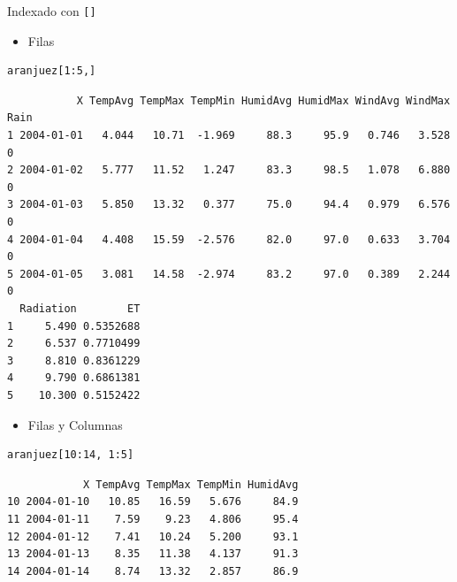 \documentclass[xcolor={usenames,svgnames,dvipsnames}]{beamer}
\begin{document}
\begin{frame}[fragile,label=sec-5-2-1]{Indexado con \texttt{[]}}
 \begin{itemize}
\item Filas
\end{itemize}
\lstset{language=R,label= ,caption= ,numbers=none}
\begin{lstlisting}
aranjuez[1:5,]
\end{lstlisting}

\begin{verbatim}
           X TempAvg TempMax TempMin HumidAvg HumidMax WindAvg WindMax Rain
1 2004-01-01   4.044   10.71  -1.969     88.3     95.9   0.746   3.528    0
2 2004-01-02   5.777   11.52   1.247     83.3     98.5   1.078   6.880    0
3 2004-01-03   5.850   13.32   0.377     75.0     94.4   0.979   6.576    0
4 2004-01-04   4.408   15.59  -2.576     82.0     97.0   0.633   3.704    0
5 2004-01-05   3.081   14.58  -2.974     83.2     97.0   0.389   2.244    0
  Radiation        ET
1     5.490 0.5352688
2     6.537 0.7710499
3     8.810 0.8361229
4     9.790 0.6861381
5    10.300 0.5152422
\end{verbatim}

\begin{itemize}
\item Filas y Columnas
\end{itemize}
\lstset{language=R,label= ,caption= ,numbers=none}
\begin{lstlisting}
aranjuez[10:14, 1:5]
\end{lstlisting}

\begin{verbatim}
            X TempAvg TempMax TempMin HumidAvg
10 2004-01-10   10.85   16.59   5.676     84.9
11 2004-01-11    7.59    9.23   4.806     95.4
12 2004-01-12    7.41   10.24   5.200     93.1
13 2004-01-13    8.35   11.38   4.137     91.3
14 2004-01-14    8.74   13.32   2.857     86.9
\end{verbatim}
\end{frame}
\end{document}
